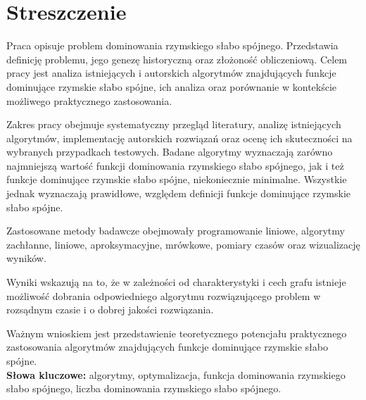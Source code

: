 \chapter*{Streszczenie}
Praca opisuje problem dominowania rzymskiego słabo spójnego. Przedstawia definicję problemu, jego genezę historyczną oraz złożoność obliczeniową. Celem pracy jest analiza istniejących i autorskich algorytmów znajdujących funkcje dominujące rzymskie słabo spójne, ich analiza oraz porównanie w kontekście możliwego praktycznego zastosowania.

Zakres pracy obejmuje systematyczny przegląd literatury, analizę istniejących algorytmów, implementację autorskich rozwiązań oraz ocenę ich skuteczności na wybranych przypadkach testowych. Badane algorytmy wyznaczają zarówno najmniejszą wartość funkcji dominowania rzymskiego słabo spójnego, jak i też funkcje dominujące rzymskie słabo spójne, niekoniecznie minimalne. Wszystkie jednak wyznaczają prawidłowe, względem definicji funkcje dominujące rzymskie słabo spójne.

Zastosowane metody badawcze obejmowały programowanie liniowe, algorytmy zachłanne, liniowe, aproksymacyjne, mrówkowe, pomiary czasów oraz wizualizację wyników.

Wyniki wskazują na to, że w zależności od charakterystyki i cech grafu istnieje możliwość dobrania odpowiedniego algorytmu rozwiązującego problem w rozsądnym czasie i o dobrej jakości rozwiązania.

Ważnym wnioskiem jest przedstawienie teoretycznego potencjału praktycznego zastosowania algorytmów znajdujących funkcje dominujące rzymskie słabo spójne.\\

\textbf{Słowa kluczowe:} algorytmy, optymalizacja, funkcja dominowania rzymskiego słabo spójnego, liczba dominowania rzymskiego słabo spójnego.
